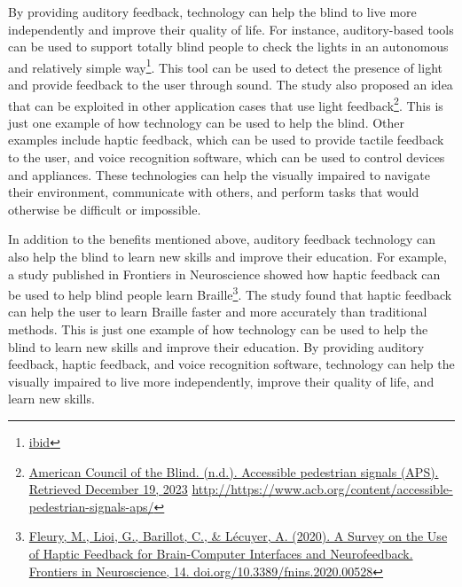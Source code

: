 \documentclass[12pt,letterpaper,twoside]{extreport}
\begin{document}
By providing auditory feedback, technology can help the blind to live more independently and improve their quality of life. For instance, auditory-based tools can be used to support totally blind people to check the lights in an autonomous and relatively simple way\footnote{\raggedright \href{http://link.springer.com/article/10.1007/s12652-020-01944-w}{ibid}}. This tool can be used to detect the presence of light and provide feedback to the user through sound. The study also proposed an idea that can be exploited in other application cases that use light feedback\footnote{\raggedright \href{http://https://www.acb.org/content/accessible-pedestrian-signals-aps/}{American Council of the Blind. (n.d.). Accessible pedestrian signals (APS). Retrieved December 19, 2023} \url{http://https://www.acb.org/content/accessible-pedestrian-signals-aps/}}. This is just one example of how technology can be used to help the blind. Other examples include haptic feedback, which can be used to provide tactile feedback to the user, and voice recognition software, which can be used to control devices and appliances. These technologies can help the visually impaired to navigate their environment, communicate with others, and perform tasks that would otherwise be difficult or impossible.

In addition to the benefits mentioned above, auditory feedback technology can also help the blind to learn new skills and improve their education. For example, a study published in Frontiers in Neuroscience showed how haptic feedback can be used to help blind people learn Braille\footnote{\raggedright \href{http://www.frontiersin.org/articles/10.3389/fnins.2020.00528/full}{Fleury, M., Lioi, G., Barillot, C., \& Lécuyer, A. (2020). A Survey on the Use of Haptic Feedback for Brain-Computer Interfaces and Neurofeedback. Frontiers in Neuroscience, 14. doi.org/10.3389/fnins.2020.00528}}. The study found that haptic feedback can help the user to learn Braille faster and more accurately than traditional methods. This is just one example of how technology can be used to help the blind to learn new skills and improve their education. By providing auditory feedback, haptic feedback, and voice recognition software, technology can help the visually impaired to live more independently, improve their quality of life, and learn new skills.
\end{document}
